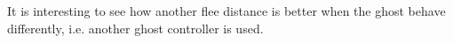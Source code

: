 It is interesting to see how another flee distance is better when the ghost behave differently, i.e. another ghost controller is used. 


















